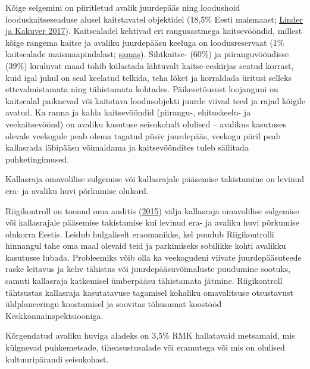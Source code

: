 \documentclass[estonian,]{article}
\begin{document}
Kõige selgemini on piiritletud avalik juurdepääs ning loodushoid looduskaitseseaduse alusel kaitstavatel objektidel (18,5\% Eesti maismaast; \protect\hyperlink{Linder2017}{Linder ja Kakuver 2017}). Kaitsealadel kehtivad eri rangusastmega kaitsevööndid, millest kõige rangema kaitse ja avaliku juurdepääsu keeluga on loodusreservaat (1\% kaitsealade maismaapindalast; \protect\hyperlink{Linder2017}{samas}). Sihtkaitse- (60\%) ja piiranguvööndisse (39\%) kuuluvat maad tohib külastada lähtuvalt kaitse-eeskirjas seatud korrast, kuid igal juhul on seal keelatud telkida, teha lõket ja korraldada üritusi selleks ettevalmistamata ning tähistamata kohtades. Päikesetõusust loojanguni on kaitsealal paiknevad või kaitstava loodusobjekti juurde viivad teed ja rajad kõigile avatud. Ka ranna ja kalda kaitsevööndid (piirangu-, ehituskeelu- ja veekaitsevöönd) on avaliku kasutuse seisukohalt olulised -- avalikus kasutuses olevale veekogule peab olema tagatud püsiv juurdepääs, veekogu piiril peab kallasrada läbipääsu võimaldama ja kaitsevööndites tuleb säilitada puhketingimused.

\begin{blockquote-right}
Kallasraja omavolilise sulgemise või kallasrajale pääsemise takistamine
on levinud era- ja avaliku huvi põrkumise olukord.
\end{blockquote-right}

Riigikontroll on toonud oma auditis (\protect\hyperlink{Riigikontroll2015}{2015}) välja kallasraja omavolilise sulgemise või kallasrajale pääsemise takistamise kui levinud era- ja avaliku huvi põrkumise olukorra Eestis. Leidub hulgaliselt eraomanikke, kel puudub Riigikontrolli hinnangul tahe oma maal olevaid teid ja parkimiseks sobilikke kohti avalikku kasutusse lubada. Probleemiks võib olla ka veekogudeni viivate juurdepääsuteede raske leitavus ja kehv tähistus või juurdepääsuvõimaluste puudumine sootuks, samuti kallasraja katkemisel ümberpääsu tähistamata jätmine. Riigikontroll tähtsustas kallasraja kasutatavuse tagamisel kohaliku omavalitsuse otsustavust üldplaneeringu koostamisel ja soovitas tõhusamat koostööd Keskkonnainspektsiooniga.

\begin{blockquote-left}
Kõrgendatud avaliku huviga aladeks on 3,5\% RMK hallatavaid metsamaid,
mis külgnevad puhkemetsade, tiheasustusalade või eramutega või mis on
olulised kultuuripärandi seisukohast.
\end{blockquote-left}
\end{document}
